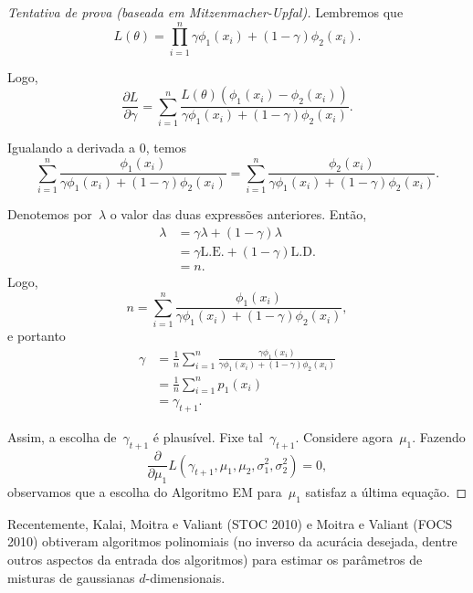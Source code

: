  \begin{proof}[Tentativa de prova (baseada em Mitzenmacher-Upfal)]
  Lembremos que
  $$L(\theta) = \prod_{i=1}^{n} \gamma \phi_1(x_i) + (1-\gamma) \phi_2(x_i).$$
  
  Logo,
  $$\frac{\partial L}{\partial \gamma} = \sum_{i=1}^{n}
  \frac{L(\theta)(\phi_1(x_i)-\phi_2(x_i))}
  {\gamma \phi_1(x_i) + (1-\gamma) \phi_2(x_i)}.$$
  
  Igualando a derivada a $0$, temos
  $$\sum_{i=1}^{n} \frac{\phi_1(x_i)}
  {\gamma \phi_1(x_i) + (1-\gamma) \phi_2(x_i)}
  =\sum_{i=1}^{n} \frac{\phi_2(x_i)}
  {\gamma \phi_1(x_i) + (1-\gamma) \phi_2(x_i)}.$$
  
  Denotemos por~$\lambda$ o valor das duas expressões anteriores. Então,
  $$\begin{aligned}
     \lambda &= \gamma \lambda + (1-\gamma) \lambda \\
     &= \gamma \text{L.E.} + (1-\gamma) \text{L.D.} \\
     &= n.
    \end{aligned}
  $$
  Logo,
  $$n = \sum_{i=1}^{n} \frac{\phi_1(x_i)}
  {\gamma \phi_1(x_i) + (1-\gamma) \phi_2(x_i)},$$
  e portanto
  $$\begin{aligned} \gamma
  &= \frac{1}{n} \sum_{i=1}^{n} \frac{\gamma \phi_1(x_i)}
  {\gamma \phi_1(x_i) + (1-\gamma) \phi_2(x_i)} \\
  &= \frac{1}{n} \sum_{i=1}^{n} p_1(x_i) \\
  &= \gamma_{t+1}.
  \end{aligned}$$
  
  Assim, a escolha de~$\gamma_{t+1}$ é plausível.
  Fixe tal~$\gamma_{t+1}$. Considere agora~$\mu_1$.
  Fazendo
  $$\frac{\partial}{\partial \mu_1} L(\gamma_{t+1},\mu_1,\mu_2,
  \sigma_1^2, \sigma_2^2) = 0,$$
  observamos que a escolha do Algoritmo EM para~$\mu_1$
  satisfaz a última equação.
 \end{proof}

 Recentemente, Kalai, Moitra e Valiant (STOC 2010)
 e Moitra e Valiant (FOCS 2010)
 obtiveram algoritmos polinomiais (no inverso da acurácia desejada,
 dentre outros aspectos da entrada dos algoritmos)
 para estimar os parâmetros de misturas de gaussianas $d$-dimensionais.
 
